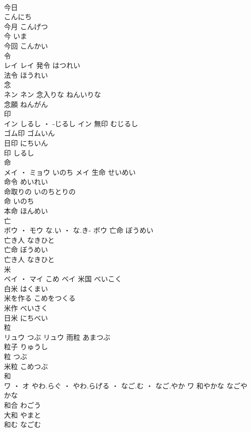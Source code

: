 \documentclass[8pt]{extreport}
\begin{document}
\begin{CJK}{UTF8}{min}
\\	今日 
\\	こんにち	
\\	今月	こんげつ	
\\	今	いま	
\\	今回	こんかい	
\\	令	
\\	レイ		レイ	発令	はつれい	
\\	法令	ほうれい	
\\	念	
\\	ネン		ネン	念入りな	ねんいりな	
\\	念願	ねんがん	
\\	印	
\\	イン	しるし ・ -じるし	イン	無印	むじるし	
\\	ゴム印	ゴムいん	
\\	日印	にちいん	
\\	印	しるし	
\\	命	
\\	メイ ・ ミョウ	いのち	メイ	生命	せいめい	
\\	命令	めいれい	
\\	命取りの	いのちとりの	
\\	命	いのち	
\\	本命	ほんめい	
\\	亡	
\\	ボウ ・ モウ	な.い ・ な.き-	ボウ	亡命	ぼうめい	
\\	亡き人	なきひと	
\\	亡命	ぼうめい	
\\	亡き人	なきひと	
\\	米	
\\	ベイ ・ マイ	こめ	ベイ	米国	べいこく	
\\	白米	はくまい	
\\	米を作る	こめをつくる	
\\	米作	べいさく	
\\	日米	にちべい	
\\	粒	
\\	リュウ	つぶ	リュウ	雨粒	あまつぶ	
\\	粒子	りゅうし	
\\	粒	つぶ	
\\	米粒	こめつぶ	
\\	和	
\\	ワ ・ オ	やわ.らぐ ・ やわ.らげる ・ なご.む ・ なご.やか	ワ	和やかな	なごやかな	
\\	和合	わごう	
\\	大和	やまと	
\\	和む	なごむ	

\end{CJK}
\end{document}
